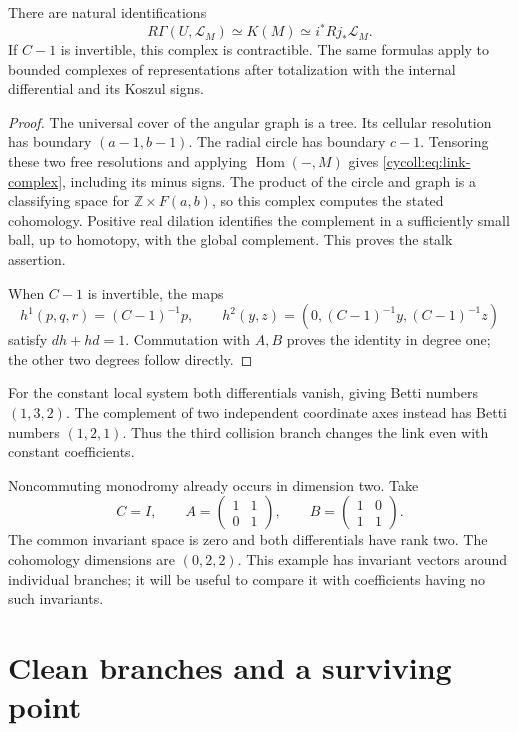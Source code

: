 \begin{proposition}\label{cycoll:prop:link}
There are natural identifications
\[
 R\Gamma(U,\mathcal L_M)\simeq K(M)
       \simeq i^*Rj_*\mathcal L_M.
\]
If $C-1$ is invertible, this complex is contractible. The same
formulas apply to bounded complexes of representations after
totalization with the internal differential and its Koszul signs.
\end{proposition}
\begin{proof}
The universal cover of the angular graph is a tree. Its cellular
resolution has boundary $(a-1,b-1)$. The radial circle has
boundary $c-1$. Tensoring these two free resolutions and applying
$\operatorname{Hom}(-,M)$ gives
\eqref{cycoll:eq:link-complex}, including its minus signs.
The product of the circle and graph is a classifying space for
$\mathbb Z\times F(a,b)$, so this complex computes the stated
cohomology. Positive real dilation identifies the complement in
a sufficiently small ball, up to homotopy, with the global
complement. This proves the stalk assertion.

When $C-1$ is invertible, the maps
\[
 h^1(p,q,r)=(C-1)^{-1}p,\qquad
 h^2(y,z)=(0,(C-1)^{-1}y,(C-1)^{-1}z)
\]
satisfy $dh+hd=1$. Commutation with $A,B$ proves the identity
in degree one; the other two degrees follow directly.
\end{proof}

For the constant local system both differentials vanish, giving
Betti numbers $(1,3,2)$. The complement of two independent
coordinate axes instead has Betti numbers $(1,2,1)$. Thus the
third collision branch changes the link even with constant
coefficients.

Noncommuting monodromy already occurs in dimension two. Take
\[
 C=I,\qquad
 A=\begin{pmatrix}1&1\\0&1\end{pmatrix},\qquad
 B=\begin{pmatrix}1&0\\1&1\end{pmatrix}.
\]
The common invariant space is zero and both differentials have
rank two. The cohomology dimensions are $(0,2,2)$. This example
has invariant vectors around individual branches; it will be
useful to compare it with coefficients having no such invariants.

\section{Clean branches and a surviving point}
\label{cycoll:sec:clean}

